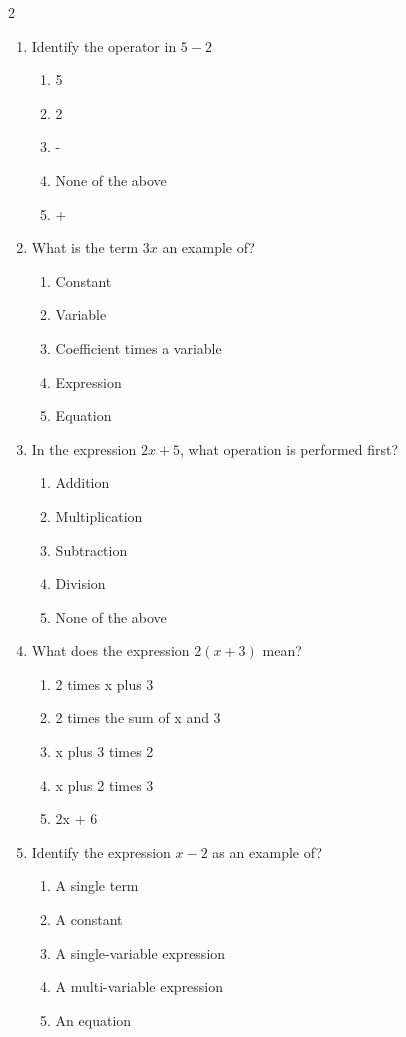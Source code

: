 \documentclass[10pt]{article}
\begin{document}
\begin{multicols}{2}
\begin{enumerate}[label=\textbf{Q\arabic*.}, leftmargin=*, itemsep=6pt, parsep=0pt]
  \item \small Identify the operator in $5 - 2$
  \begin{enumerate}[label=(\Alph*), leftmargin=0.6cm, nosep, itemsep=2pt]
    \item 5
    \item 2
    \item -
    \item None of the above
    \item +
  \end{enumerate}

  \item \small What is the term $3x$ an example of?
  \begin{enumerate}[label=(\Alph*), leftmargin=0.6cm, nosep, itemsep=2pt]
    \item Constant
    \item Variable
    \item Coefficient times a variable
    \item Expression
    \item Equation
  \end{enumerate}

  \item \small In the expression $2x + 5$, what operation is performed first?
  \begin{enumerate}[label=(\Alph*), leftmargin=0.6cm, nosep, itemsep=2pt]
    \item Addition
    \item Multiplication
    \item Subtraction
    \item Division
    \item None of the above
  \end{enumerate}

  \item \small What does the expression $2(x + 3)$ mean?
  \begin{enumerate}[label=(\Alph*), leftmargin=0.6cm, nosep, itemsep=2pt]
    \item 2 times x plus 3
    \item 2 times the sum of x and 3
    \item x plus 3 times 2
    \item x plus 2 times 3
    \item 2x + 6
  \end{enumerate}

  \item \small Identify the expression $x - 2$ as an example of?
  \begin{enumerate}[label=(\Alph*), leftmargin=0.6cm, nosep, itemsep=2pt]
    \item A single term
    \item A constant
    \item A single-variable expression
    \item A multi-variable expression
    \item An equation
  \end{enumerate}


\end{enumerate}
\end{multicols}
\end{document}
